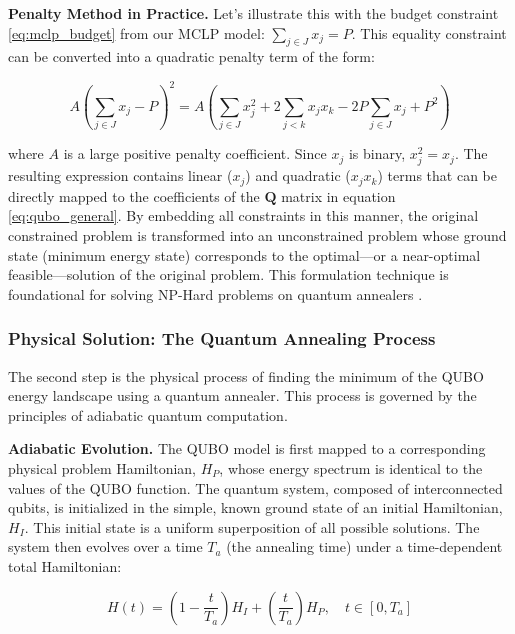 \documentclass[11pt,a4paper]{article}
\begin{document}
\textbf{Penalty Method in Practice.} Let's illustrate this with the budget constraint \eqref{eq:mclp_budget} from our MCLP model: $\sum_{j \in J} x_j = P$. This equality constraint can be converted into a quadratic penalty term of the form:

\begin{equation}
    A \left( \sum_{j \in J} x_j - P \right)^2 = A \left( \sum_{j \in J} x_j^2 + 2 \sum_{j < k} x_j x_k - 2P \sum_{j \in J} x_j + P^2 \right)
    \label{eq:penalty_example}
\end{equation}

where $A$ is a large positive penalty coefficient. Since $x_j$ is binary, $x_j^2 = x_j$. The resulting expression contains linear ($x_j$) and quadratic ($x_j x_k$) terms that can be directly mapped to the coefficients of the $\mathbf{Q}$ matrix in equation \eqref{eq:qubo_general}. By embedding all constraints in this manner, the original constrained problem is transformed into an unconstrained problem whose ground state (minimum energy state) corresponds to the optimal---or a near-optimal feasible---solution of the original problem. This formulation technique is foundational for solving NP-Hard problems on quantum annealers \cite{lucas2014ising}.

\subsubsection{Physical Solution: The Quantum Annealing Process}

The second step is the physical process of finding the minimum of the QUBO energy landscape using a quantum annealer. This process is governed by the principles of adiabatic quantum computation.

\textbf{Adiabatic Evolution.} The QUBO model is first mapped to a corresponding physical problem Hamiltonian, $H_P$, whose energy spectrum is identical to the values of the QUBO function. The quantum system, composed of interconnected qubits, is initialized in the simple, known ground state of an initial Hamiltonian, $H_I$. This initial state is a uniform superposition of all possible solutions. The system then evolves over a time $T_a$ (the annealing time) under a time-dependent total Hamiltonian:

\begin{equation}
    H(t) = \left(1 - \frac{t}{T_a}\right) H_I + \left(\frac{t}{T_a}\right) H_P, \quad t \in [0, T_a]
    \label{eq:adiabatic}
\end{equation}
\end{document}
